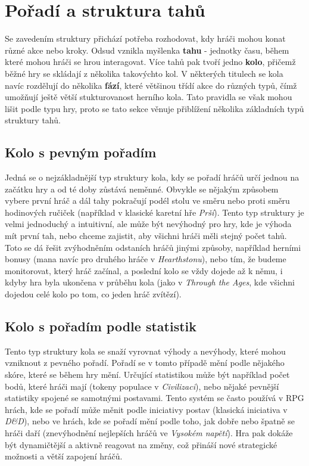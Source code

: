 
\section{Pořadí a struktura tahů}
\label{sec:turns}

Se zavedením struktury přichází potřeba rozhodovat, kdy hráči mohou konat různé akce nebo kroky. Odsud vznikla myšlenka \textbf{tahu} - jednotky času, během které mohou hráči se hrou interagovat. Více tahů pak tvoří jedno \textbf{kolo}, přičemž běžné hry se skládají z několika takovýchto kol. V některých titulech se kola navíc rozdělují do několika \textbf{fází}, které většinou třídí akce do různých typů, čímž umožňují ještě větší stukturovanost herního kola. Tato pravidla se však mohou lišit podle typu hry, proto se tato sekce věnuje přiblížení několika základních typů struktury tahů.

\subsection{Kolo s pevným pořadím}
\label{subsec:fixed_order}

Jedná se o nejzákladnější typ struktury kola, kdy se pořadí hráčů určí jednou na začátku hry a od té doby zůstává neměnné. Obvykle se nějakým způsobem vybere první hráč a dál tahy pokračují podél stolu ve směru nebo proti směru hodinových ručiček (například v klasické karetní hře \textit{Prší}). Tento typ struktury je velmi jednoduchý a intuitivní, ale může být nevýhodný pro hry, kde je výhoda mít první tah, nebo chceme zajistit, aby všichni hráči měli stejný počet tahů. Toto se dá řešit zvýhodněním odstaních hráčů jinými způsoby, například herními bonusy (mana navíc pro druhého hráče v \textit{Hearthstonu}), nebo tím, že budeme monitorovat, který hráč začínal, a poslední kolo se vždy dojede až k němu, i kdyby hra byla ukončena v průběhu kola (jako v \textit{Through the Ages}, kde všichni dojedou celé kolo po tom, co jeden hráč zvítězí).

\subsection{Kolo s pořadím podle statistik}
\label{subsec:stat_order}

Tento typ struktury kola se snaží vyrovnat výhody a nevýhody, které mohou vzniknout z pevného pořadí. Pořadí se v tomto případě mění podle nějakého skóre, které se během hry mění. Určující statistikou může být například počet bodů, které hráči mají (tokeny populace v \textit{Civilizaci}), nebo nějaké pevnější statistiky spojené se samotnými postavami. Tento systém se často používá v RPG hrách, kde se pořadí může měnit podle iniciativy postav (klasická iniciativa v \textit{D\&D}), nebo ve hrách, kde se pořadí mění podle toho, jak dobře nebo špatně se hráči daří (znevýhodnění nejlepších hráčů ve \textit{Vysokém napětí}). Hra pak dokáže být dynamičtější a aktivně reagovat na změny, což přináší nové strategické možnosti a větší zapojení hráčů.

